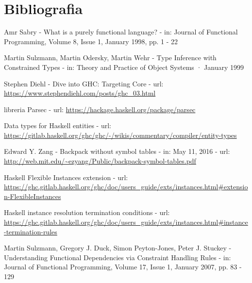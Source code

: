 \documentclass[10pt,a4paper]{article}
\begin{document}
\section*{Bibliografia}
\begin{enumerate}[label={[\arabic*]}]
    \item Amr Sabry - What is a purely functional language? - in: Journal of Functional Programming, Volume 8, Issue 1,
    January 1998, pp. 1 - 22
    \item Martin Sulzmann, Martin Odersky, Martin Wehr - Type Inference with Constrained Types - in: Theory and Practice
    of Object Systems · January 1999
    \item Stephen Diehl - Dive into GHC: Targeting Core - url: \url{https://www.stephendiehl.com/posts/ghc_03.html}
    \item libreria Parsec - url: \url{https://hackage.haskell.org/package/parsec}
    \item Data types for Haskell entities - url:
    \url{https://gitlab.haskell.org/ghc/ghc/-/wikis/commentary/compiler/entity-types}
    \item Edward Y. Zang - Backpack without symbol tables - in: May 11, 2016 - url:
    \url{http://web.mit.edu/~ezyang/Public/backpack-symbol-tables.pdf}
    \item Haskell Flexible Instances extension - url:
    \url{https://ghc.gitlab.haskell.org/ghc/doc/users_guide/exts/instances.html#extension-FlexibleInstances}
    \item Haskell instance resolution termination conditions - url:
    \url{https://ghc.gitlab.haskell.org/ghc/doc/users_guide/exts/instances.html#instance-termination-rules}
    \item Martin Sulzmann, Gregory J. Duck, Simon Peyton-Jones, Peter J. Stuckey - Understanding Functional Dependencies
    via Constraint Handling Rules - in: Journal of Functional Programming, Volume 17, Issue 1, January 2007, pp. 83 - 129
\end{enumerate}
\end{document}

